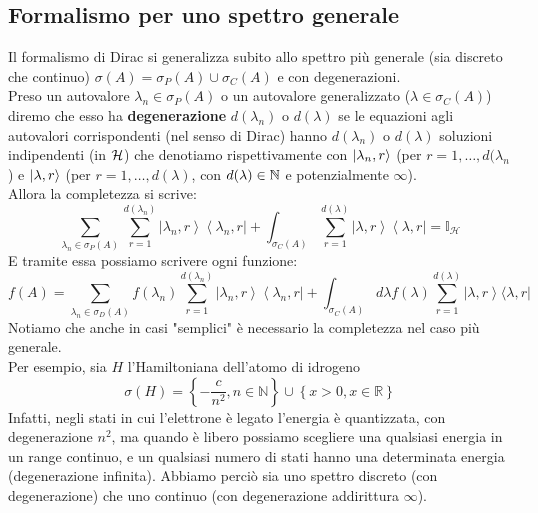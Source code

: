 \documentclass[12pt]{article}
\begin{document}
\subsection{Formalismo per uno spettro generale}
Il formalismo di Dirac si generalizza subito allo spettro più generale (sia discreto che continuo) $\sigma \left(A\right)= \sigma_P(A)\cup \sigma_C\left(A\right)$ e con degenerazioni.\\
Preso un autovalore $\lambda_n\in \sigma_P(A)$ o un autovalore generalizzato ($\lambda \in \sigma_C(A)$) diremo che esso ha \textbf{degenerazione} $d(\lambda_n)$ o $d\left(\lambda\right)$ se le equazioni agli autovalori corrispondenti (nel senso di Dirac) hanno $d\left(\lambda_n\right)$ o $d\left(\lambda\right)$ soluzioni indipendenti (in $\mathcal{H}$) che denotiamo rispettivamente con $\ket{\lambda_{n}, r}$ (per $r=1,\dots, d(\lambda_n$) e $\ket{\lambda, r}$ (per $r = 1,\dots, d(\lambda)$, con $d(\lambda) \in \mathbb{N}$ e potenzialmente $\infty$).\\ 
Allora la completezza si scrive:
\[
\sum_{\lambda_n\in\sigma_P\left(A\right)}\sum_{r=1}^{d\left(\lambda_n\right)}{\left|\lambda_n,r\right\rangle\left\langle\lambda_n,r\right|+\int_{\sigma_C\left(A\right)}\sum_{r=1}^{d\left(\lambda\right)}\left|\lambda,r\right\rangle\left\langle\lambda,r\right|=\mathbb{I}_\mathcal{H}}
\]
E tramite essa possiamo scrivere ogni funzione:
\[
f\left(A\right)= \sum_{\lambda_n\in\sigma_D\left(A\right)} f\left(\lambda_n\right)\sum_{r=1}^{d\left(\lambda_n\right)}\left|\lambda_n,r\right\rangle\left\langle\lambda_n,r\right|+\int_{\sigma_C\left(A\right)}{d\lambda f\left(\lambda\right)}\sum_{r=1}^{d\left(\lambda\right)}{\left|\lambda,r\right\rangle\langle\lambda,r|}
\]
Notiamo che anche in casi "semplici" è necessario la completezza nel caso più generale.\\
Per esempio, sia $H$ l'Hamiltoniana dell'atomo di idrogeno 
\[
\sigma \left(H\right)=\left\{-\frac{c}{n^2},n\in\mathbb{N}\right\}\cup \left\{x>0,x\in\mathbb{R}\right\}
\]
Infatti, negli stati in cui l'elettrone è legato l'energia è quantizzata, con degenerazione $n^2$, ma quando è libero possiamo scegliere una qualsiasi energia in un range continuo, e un qualsiasi numero di stati hanno una determinata energia (degenerazione infinita). Abbiamo perciò sia uno spettro discreto (con degenerazione) che uno continuo (con degenerazione addirittura $\infty$).
\end{document}
